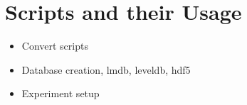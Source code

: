 \section{Scripts and their Usage}
\label{sec:scripts}

\begin{itemize}
	\item Convert scripts
	\item Database creation, lmdb, leveldb, hdf5
	\item Experiment setup
\end{itemize}